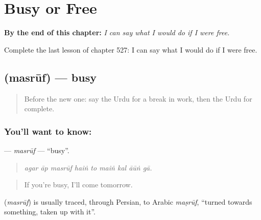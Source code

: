 
\chapter{Busy or Free}
\label{ch:ur-busy-or-free}

\begin{chapteropening}
\textbf{By the end of this chapter:} \emph{I can say what I would do if I were free.}

Complete the last lesson of chapter 527: I can say what I would do if I were free.
\end{chapteropening}

\section[\texorpdfstring{\ur{مصروف} (masrūf)}{مصروف (masrūf)}]{ (masrūf) — busy}

\label{lesson:UR-C527-masruf}



\begin{quote}
Before the new one: say the Urdu for a break in work, then the Urdu for complete.
\end{quote}

\subsection*{You'll want to know: }
\textbf{} — \emph{masrūf} — \textquotedblleft{}busy\textquotedblright{}.

\begin{quote}
        
\end{quote}

\begin{quote}
\emph{agar āp masrūf haiṅ to maiṅ kal āūṅ gā.}
\end{quote}

\begin{quote}
If you're busy, I'll come tomorrow.
\end{quote}

\begin{cousinweb}
\textbf{} (\emph{masrūf}) is usually traced, through Persian, to Arabic \emph{maṣrūf}, \textquotedblleft{}turned towards something, taken up with it\textquotedblright{}.
\end{cousinweb}

